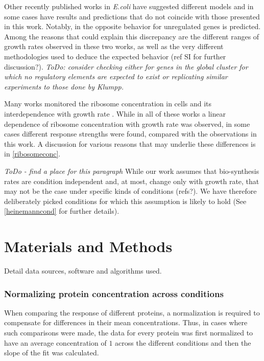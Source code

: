 \documentclass[notitlepage]{article}
\begin{document}
Other recently published works in \emph{E.coli} have suggested different models and in some cases have results  and predictions that do not coincide with those presented in this work.
Notably, in \parencite{Klumpp2009a} the opposite behavior for unregulated genes is predicted.
Among the reasons that could explain this discrepancy are the different ranges of growth rates observed in these two works, as well as the very different methodologies used to deduce the expected behavior (ref SI for further discussion?).
\emph{ToDo: consider checking either for genes in the global cluster for which no regulatory elements are expected to exist or replicating similar experiments to those done by Klumpp.} 

Many works monitored the ribosome concentration in cells and its interdependence with growth rate \parencite{Scott2010, Bremer1987, Schaechter1958, 1974, Zaslaver2009, eco-sal}.
While in all of these works a linear dependence of ribosome concentration with growth rate was observed, in some cases different response strengths were found, compared with the observations in this work.
A discussion for various reasons that may underlie these differences is in \ref{ribosomeconc}.

\emph{ToDo - find a place for this paragraph}
While our work assumes that bio-synthesis rates are condition independent and, at most, change only with growth rate, that may not be the case under specific kinds of conditions (refs?).
We have therefore deliberately picked conditions for which this assumption is likely to hold (See \ref{heinemanncond} for further details).

\section{Materials and Methods}
Detail data sources, software and algorithms used.
\subsubsection{Normalizing protein concentration across conditions}
\label{concacrossconds}
When comparing the response of different proteins, a normalization is required to compensate for differences in their mean concentrations.
Thus, in cases where such comparisons were made, the data for every protein was first normalized to have an average concentration of $1$ across the different conditions and then the slope of the fit was calculated.
\end{document}
